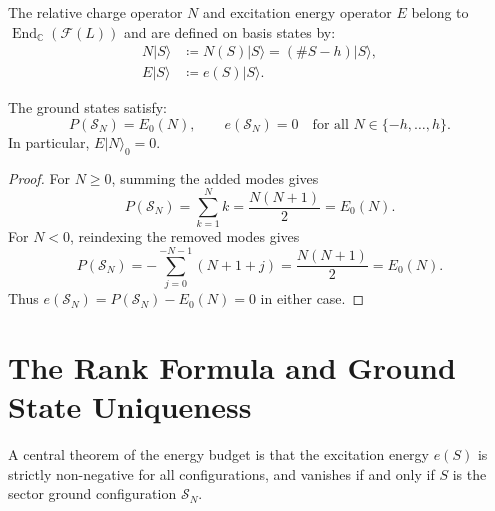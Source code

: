 \begin{definition}
The relative charge operator $N$ and excitation energy operator $E$ belong to $\operatorname{End}_{\mathbb C}(\mathcal F(L))$ and are defined on basis states by:
\begin{align}
N |S\rangle &\coloneqq N(S) |S\rangle = (\#S - h) |S\rangle, \\
E |S\rangle &\coloneqq e(S) |S\rangle.
\end{align}
\end{definition}

\begin{lemma}
The ground states satisfy:
\begin{equation}
P(\mathcal{S}_N) = E_0(N), \qquad e(\mathcal{S}_N) = 0 \quad \text{for all } N \in \{-h, \dots, h\}.
\end{equation}
In particular, $E |N\rangle_0 = 0$.
\end{lemma}

\begin{proof}
For $N\ge0$, summing the added modes gives
\begin{equation}
P(\mathcal S_N)=\sum_{k=1}^{N}k=\frac{N(N+1)}2=E_0(N).
\end{equation}
For $N<0$, reindexing the removed modes gives
\begin{equation}
P(\mathcal S_N)=-\sum_{j=0}^{-N-1}(N+1+j)=\frac{N(N+1)}2=E_0(N).
\end{equation}
Thus $e(\mathcal S_N)=P(\mathcal S_N)-E_0(N)=0$ in either case.
\end{proof}

\section{The Rank Formula and Ground State Uniqueness}

A central theorem of the energy budget is that the excitation energy $e(S)$ is strictly non-negative for all configurations, and vanishes if and only if $S$ is the sector ground configuration $\mathcal{S}_N$.

